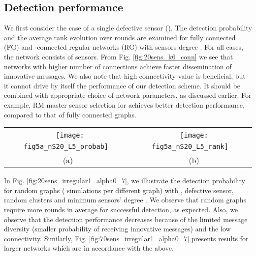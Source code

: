 \documentclass[journal]{IEEEtran}
\begin{document}
\subsection{Detection performance}
We first consider the case of a single defective sensor (). The detection probability and the average rank evolution over rounds are examined for fully connected (FG) and -connected regular networks (RG) with sensors degree . For all cases, the network consists of  sensors. From Fig. \ref{fig:20sens_k6_conn} we see that networks with higher number of connections achieve faster dissemination of innovative messages. We also note that high connectivity value  is beneficial, but it cannot drive by itself the performance of our detection scheme. It should be combined with appropriate choice of network parameters, as discussed earlier. For example, RM master sensor selection for  achieves better detection performance, compared to that of fully connected graphs.

\begin{figure*}[thb]
\begin{center}
\begin{tabular}{cc}
~\texttt{[image: fig5a\_nS20\_L5\_probab]}~&
~\texttt{[image: fig5a\_nS20\_L5\_rank]}~\\
~(a)~&~(b) \\
\end{tabular}
\end{center}
\caption{Simulation results for fully connected (FG), -regular connected (RG, ) and -connected graphs (RG, ) with  sensors,  and a random selection (RM) of  master sensors: (a) Probability of defective sensor detection; (b) Average rank of messages received per sensor.}
\label{fig:20sens_k6_conn}
\end{figure*}


In Fig. \ref{fig:20sens_irregular1_alpha0_7}, we illustrate the detection probability for random graphs ( simulations per different graph) with ,  defective sensor,  random clusters and minimum sensors' degree . We observe that random graphs require more rounds in average for successful detection, as expected. Also, we observe that the detection performance decreases because of the limited message diversity (smaller probability of receiving innovative messages) and the low connectivity. Similarly, Fig. \ref{fig:70sens_irregular1_alpha0_7} presents results for larger networks which are in accordance with the above.
\end{document}

